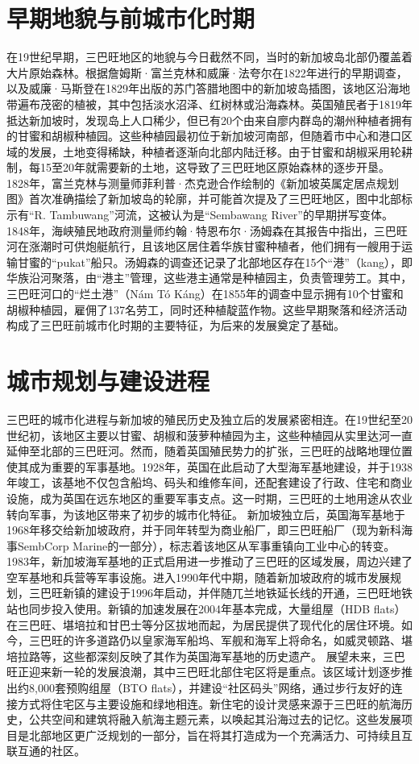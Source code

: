 \documentclass[11pt,a4paper,twoside,openany]{book}
\begin{document}
\section{早期地貌与前城市化时期}
在19世纪早期，三巴旺地区的地貌与今日截然不同，当时的新加坡岛北部仍覆盖着大片原始森林。根据詹姆斯·富兰克林和威廉·法夸尔在1822年进行的早期调查，以及威廉·马斯登在1829年出版的苏门答腊地图中的新加坡岛插图，该地区沿海地带遍布茂密的植被，其中包括淡水沼泽、红树林或沿海森林。英国殖民者于1819年抵达新加坡时，发现岛上人口稀少，但已有20个由来自廖内群岛的潮州种植者拥有的甘蜜和胡椒种植园。这些种植园最初位于新加坡河南部，但随着市中心和港口区域的发展，土地变得稀缺，种植者逐渐向北部内陆迁移。由于甘蜜和胡椒采用轮耕制，每15至20年就需要新的土地，这导致了三巴旺地区原始森林的逐步开垦。
1828年，富兰克林与测量师菲利普·杰克逊合作绘制的《新加坡英属定居点规划图》首次准确描绘了新加坡岛的轮廓，并可能首次提及了三巴旺地区，图中北部标示有“R. Tambuwang”河流，这被认为是“Sembawang River”的早期拼写变体。1848年，海峡殖民地政府测量师约翰·特恩布尔·汤姆森在其报告中指出，三巴旺河在涨潮时可供炮艇航行，且该地区居住着华族甘蜜种植者，他们拥有一艘用于运输甘蜜的“pukat”船只。汤姆森的调查还记录了北部地区存在15个“港”（kang），即华族沿河聚落，由“港主”管理，这些港主通常是种植园主，负责管理劳工。其中，三巴旺河口的“烂土港”（Nám Tó Káng）在1855年的调查中显示拥有10个甘蜜和胡椒种植园，雇佣了137名劳工，同时还种植靛蓝作物。这些早期聚落和经济活动构成了三巴旺前城市化时期的主要特征，为后来的发展奠定了基础。

\section{城市规划与建设进程}
三巴旺的城市化进程与新加坡的殖民历史及独立后的发展紧密相连。在19世纪至20世纪初，该地区主要以甘蜜、胡椒和菠萝种植园为主，这些种植园从实里达河一直延伸至北部的三巴旺河。然而，随着英国殖民势力的扩张，三巴旺的战略地理位置使其成为重要的军事基地。1928年，英国在此启动了大型海军基地建设，并于1938年竣工，该基地不仅包含船坞、码头和维修车间，还配套建设了行政、住宅和商业设施，成为英国在远东地区的重要军事支点。这一时期，三巴旺的土地用途从农业转向军事，为该地区带来了初步的城市化特征。
新加坡独立后，英国海军基地于1968年移交给新加坡政府，并于同年转型为商业船厂，即三巴旺船厂（现为新科海事SembCorp Marine的一部分），标志着该地区从军事重镇向工业中心的转变。1983年，新加坡海军基地的正式启用进一步推动了三巴旺的区域发展，周边兴建了空军基地和兵营等军事设施。进入1990年代中期，随着新加坡政府的城市发展规划，三巴旺新镇的建设于1996年启动，并伴随兀兰地铁延长线的开通，三巴旺地铁站也同步投入使用。新镇的加速发展在2004年基本完成，大量组屋（HDB flats）在三巴旺、堪培拉和甘巴士等分区拔地而起，为居民提供了现代化的居住环境。如今，三巴旺的许多道路仍以皇家海军船坞、军舰和海军上将命名，如威灵顿路、堪培拉路等，这些都深刻反映了其作为英国海军基地的历史遗产。
展望未来，三巴旺正迎来新一轮的发展浪潮，其中三巴旺北部住宅区将是重点。该区域计划逐步推出约8,000套预购组屋（BTO flats），并建设“社区码头”网络，通过步行友好的连接方式将住宅区与主要设施和绿地相连。新住宅的设计灵感来源于三巴旺的航海历史，公共空间和建筑将融入航海主题元素，以唤起其沿海过去的记忆。这些发展项目是北部地区更广泛规划的一部分，旨在将其打造成为一个充满活力、可持续且互联互通的社区。
\end{document}
